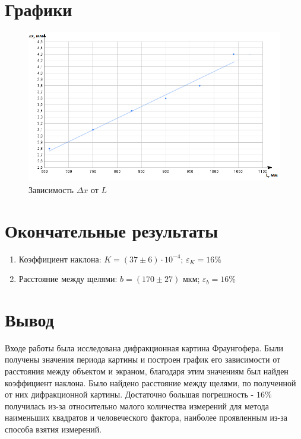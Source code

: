 \documentclass{article}
\begin{document}
\section{Графики}
\begin{figure}[h!]
    \begin{center}
    \includegraphics[scale=0.8]{chart.png}
    \caption{Зависимость $\Delta x$ от $L$}
    \label{fig:graphUfromI}    
    \end{center}
\end{figure}
\newpage
\section{Окончательные результаты}
\begin{enumerate}
    \item Коэффициент наклона: $K = (37 \pm 6 )\cdot 10^{-4}$; $\varepsilon_{K} = 16\%$  
    \item Расстояние между щелями: $b = (170 \pm 27 )$ мкм; $\varepsilon_{b} = 16\%$  
\end{enumerate}
\newpage
\section{Вывод}
Входе работы была  исследована дифракционная картина Фраунгофера. Были получены значения периода картины и построен график его зависимости от расстояния между объектом и экраном, благодаря этим значениям был найден коэффициент наклона. Было найдено расстояние между щелями, по полученной от них дифракционной картины. Достаточно большая погрешность - $16\%$ получилась из-за относительно малого количества измерений для метода наименьших квадратов и человеческого фактора, наиболее проявленным из-за способа взятия измерений.
\end{document}
